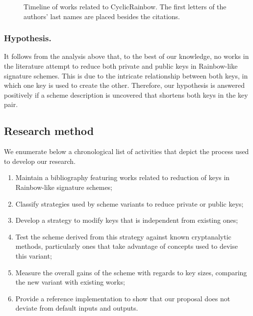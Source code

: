 \documentclass[openright]{report}
\begin{document}
\begin{figure}[htbp]
\stopchronology
\caption{Timeline of works related to CyclicRainbow. The first letters of the authors' last names are placed besides the citations.}\label{fig:2}
\end{figure}


\subsubsection{Hypothesis.} It follows from the analysis above that, to the best of our knowledge, no works in the literature attempt to reduce both private and public keys in Rainbow-like signature schemes. This is due to the intricate relationship between both keys, in which one key is used to create the other. Therefore, our hypothesis is answered positively if a scheme description is uncovered that shortens both keys in the key pair.

\subsection{Research method}

We enumerate below a chronological list of activities that depict the process used to develop our research.

\begin{enumerate}[label=(\roman*), itemsep=1pt]
    \item Maintain a bibliography featuring works related to reduction of keys in Rainbow-like signature schemes;
    \item Classify strategies used by scheme variants to reduce private or public keys;
    \item Develop a strategy to modify keys that is independent from existing ones;
    \item Test the scheme derived from this strategy against known cryptanalytic methods, particularly ones that take advantage of concepts used to devise this variant;
    \item Measure the overall gains of the scheme with regards to key sizes, comparing the new variant with existing works;
    \item Provide a reference implementation to show that our proposal does not deviate from default inputs and outputs.
\end{enumerate}
\end{document}

